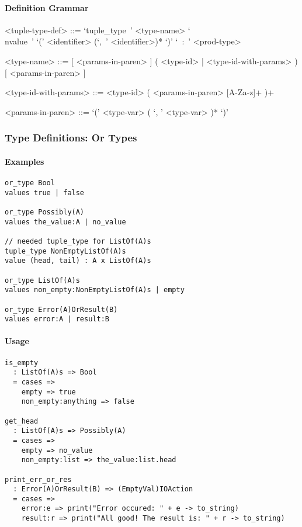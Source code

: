 \documentclass{article}
\begin{document}
\paragraph{Definition Grammar}
\begin{grammar}
<tuple-type-def> ::= 
`tuple_type\ ' <type-name>
`\\nvalue\ ' `(' <identifier> (`,\ ' <identifier>)* `)' `\ :\ ' <prod-type>

<type-name> ::= 
[ <params-in-paren> ] ( <type-id> | <type-id-with-params> ) [ <params-in-paren> ]

<type-id-with-params> ::= 
<type-id> ( <params-in-paren> [A-Za-z]+ )+

<params-in-paren> ::= `(' <type-var> ( `, ' <type-var> )* `)'
\end{grammar}

\subsubsection{Type Definitions: Or Types}
\label{subsubsec:orts}

\paragraph{Examples}

\begin{verbatim}
or_type Bool
values true | false

or_type Possibly(A)
values the_value:A | no_value

// needed tuple_type for ListOf(A)s
tuple_type NonEmptyListOf(A)s
value (head, tail) : A x ListOf(A)s

or_type ListOf(A)s
values non_empty:NonEmptyListOf(A)s | empty

or_type Error(A)OrResult(B)
values error:A | result:B
\end{verbatim}

\paragraph{Usage}

\begin{verbatim}
is_empty
  : ListOf(A)s => Bool
  = cases => 
    empty => true
    non_empty:anything => false

get_head
  : ListOf(A)s => Possibly(A)
  = cases => 
    empty => no_value
    non_empty:list => the_value:list.head

print_err_or_res
  : Error(A)OrResult(B) => (EmptyVal)IOAction
  = cases => 
    error:e => print("Error occured: " + e -> to_string)
    result:r => print("All good! The result is: " + r -> to_string)
\end{verbatim}
\end{document}
